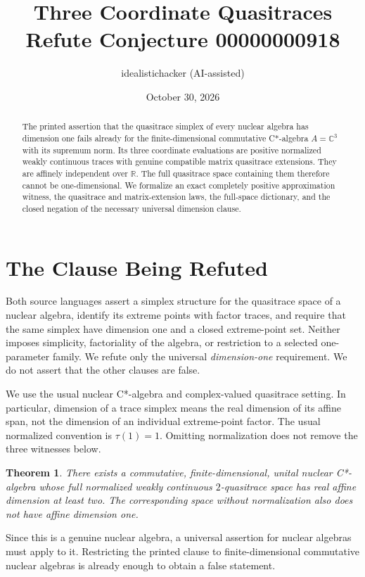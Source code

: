 \documentclass[11pt]{article}
\title{Three Coordinate Quasitraces Refute Conjecture 00000000918}
\author{idealistichacker \quad (AI-assisted)}
\date{October 30, 2026}
\newtheorem{theorem}{Theorem}
\newcommand{\C}{\mathbb C}
\newcommand{\R}{\mathbb R}
\begin{document}
\maketitle
\begin{abstract}
The printed assertion that the quasitrace simplex of every nuclear algebra
has dimension one fails already for the finite-dimensional commutative
C*-algebra $A=\C^3$ with its supremum norm. Its three coordinate evaluations
are positive normalized weakly continuous traces with genuine compatible
matrix quasitrace extensions. They are affinely independent over $\R$.
The full quasitrace space containing them therefore cannot be one-dimensional.
We formalize an exact completely positive approximation witness, the
quasitrace and matrix-extension laws, the full-space dictionary, and the
closed negation of the necessary universal dimension clause.
\end{abstract}

\section{The Clause Being Refuted}
Both source languages assert a simplex structure for the quasitrace space
of a nuclear algebra, identify its extreme points with factor traces, and
require that the same simplex have dimension one and a closed extreme-point
set. Neither imposes simplicity, factoriality of the algebra, or restriction
to a selected one-parameter family. We refute only the universal
\emph{dimension-one} requirement. We do not assert that the other clauses
are false.

We use the usual nuclear C*-algebra and complex-valued quasitrace setting.
In particular, dimension of a trace simplex means the real dimension of
its affine span, not the dimension of an individual extreme-point factor.
The usual normalized convention is $\tau(1)=1$. Omitting normalization
does not remove the three witnesses below.

\begin{theorem}\label{thm:main}
There exists a commutative, finite-dimensional, unital nuclear C*-algebra
whose full normalized weakly continuous $2$-quasitrace space has real affine
dimension at least two. The corresponding space without normalization also
does not have affine dimension one.
\end{theorem}
Since this is a genuine nuclear algebra, a universal assertion for nuclear
algebras must apply to it. Restricting the printed clause to finite-dimensional
commutative nuclear algebras is already enough to obtain a false statement.
\end{document}
